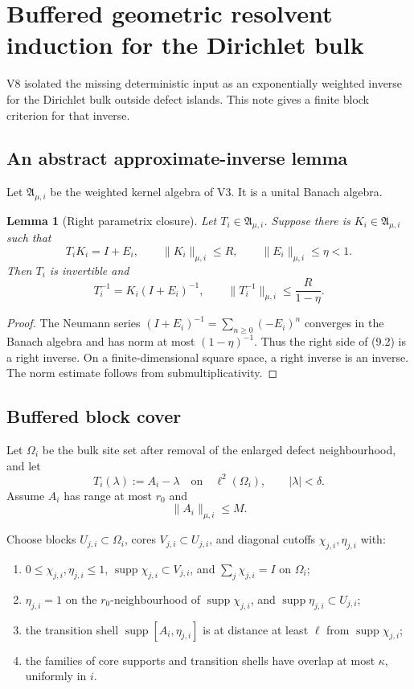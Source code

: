 \documentclass[11pt]{article}
\newtheorem{lemma}[theorem]{Lemma}
\newcommand{\supp}{\operatorname{supp}}
\begin{document}
\section{Buffered geometric resolvent induction for the Dirichlet bulk}
\label{sec:v11v9}

V8 isolated the missing deterministic input as an exponentially weighted
inverse for the Dirichlet bulk outside defect islands.  This note gives a
finite block criterion for that inverse.

\subsection{An abstract approximate-inverse lemma}

Let \(\mathfrak A_{\mu,i}\) be the weighted kernel algebra of V3.  It is a
unital Banach algebra.

\begin{lemma}[Right parametrix closure]
\label{lem:v11v9-parametrix}
Let \(T_i\in\mathfrak A_{\mu,i}\).  Suppose there is
\(K_i\in\mathfrak A_{\mu,i}\) such that
\[
 T_iK_i=I+E_i,\qquad
 \|K_i\|_{\mu,i}\leq R,\qquad
 \|E_i\|_{\mu,i}\leq\eta<1.
 \tag{9.1}
\]
Then \(T_i\) is invertible and
\[
 T_i^{-1}=K_i(I+E_i)^{-1},\qquad
 \|T_i^{-1}\|_{\mu,i}\leq\frac{R}{1-\eta}.
 \tag{9.2}
\]
\end{lemma}

\begin{proof}
The Neumann series
\((I+E_i)^{-1}=\sum_{n\geq0}(-E_i)^n\)
converges in the Banach algebra and has norm at most
\((1-\eta)^{-1}\).  Thus the right side of (9.2) is a right inverse.
On a finite-dimensional square space, a right inverse is an inverse.
The norm estimate follows from submultiplicativity.
\end{proof}

\subsection{Buffered block cover}

Let \(\Omega_i\) be the bulk site set after removal of the enlarged defect
neighbourhood, and let
\[
 T_i(\lambda):=A_i-\lambda
 \quad\text{on}\quad\ell^2(\Omega_i),
 \qquad |\lambda|<\delta.
 \tag{9.3}
\]
Assume \(A_i\) has range at most \(r_0\) and
\[
 \|A_i\|_{\mu,i}\leq M.
 \tag{9.4}
\]

Choose blocks \(U_{j,i}\subset\Omega_i\), cores
\(V_{j,i}\subset U_{j,i}\), and diagonal cutoffs
\(\chi_{j,i},\eta_{j,i}\) with:
\begin{enumerate}[label=\textnormal{(B\arabic*)}]
\item \(0\leq\chi_{j,i},\eta_{j,i}\leq1\),
\(\supp\chi_{j,i}\subset V_{j,i}\), and
\(\sum_j\chi_{j,i}=I\) on \(\Omega_i\);
\item \(\eta_{j,i}=1\) on the \(r_0\)-neighbourhood of
\(\supp\chi_{j,i}\), and
\(\supp\eta_{j,i}\subset U_{j,i}\);
\item the transition shell
\(\supp[A_i,\eta_{j,i}]\) is at distance at least \(\ell\) from
\(\supp\chi_{j,i}\);
\item the families of core supports and transition shells have overlap at
most \(\kappa\), uniformly in \(i\).
\end{enumerate}
\end{document}
